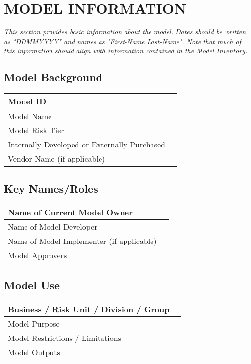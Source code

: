 \documentclass[12pt,letterpaper]{article}
\begin{document}
\section{MODEL INFORMATION}
\textit{This section provides basic information about the model. Dates should be written as "DDMMYYYY" and names as "First-Name Last-Name". Note that much of this information should align with information contained in the Model Inventory.}

\subsection{Model Background}

\begin{tabular}{|p{}|p{}|}
\hline
Model ID & \\
\hline
Model Name & \\
\hline
Model Risk Tier & \\
\hline
Internally Developed or Externally Purchased & \\
\hline
Vendor Name (if applicable) & \\
\hline
\end{tabular}

\subsection{Key Names/Roles}

\begin{tabular}{|p{}|p{}|}
\hline
Name of Current Model Owner & \\
\hline
Name of Model Developer & \\
\hline
Name of Model Implementer (if applicable) & \\
\hline
Model Approvers & \\
\hline
\end{tabular}

\subsection{Model Use}

\begin{tabular}{|p{}|p{}|}
\hline
Business / Risk Unit / Division / Group & \\
\hline
Model Purpose & \\
\hline
Model Restrictions / Limitations & \\
\hline
Model Outputs & \\
\hline
\end{tabular}
\end{document}
